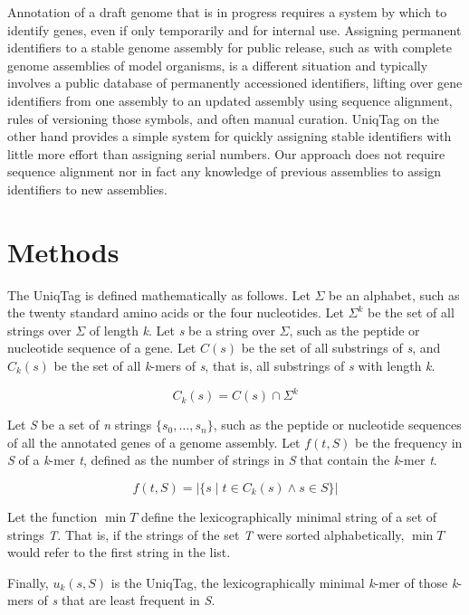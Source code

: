 \documentclass[10pt]{article}
\begin{document}
Annotation of a draft genome that is in progress requires a system by
which to identify genes, even if only temporarily and for internal use.
Assigning permanent identifiers to a stable genome assembly for public
release, such as with complete genome assemblies of model organisms, is
a different situation and typically involves a public database of
permanently accessioned identifiers, lifting over gene identifiers from
one assembly to an updated assembly using sequence alignment, rules of
versioning those symbols, and often manual curation. UniqTag on the
other hand provides a simple system for quickly assigning stable
identifiers with little more effort than assigning serial numbers. Our
approach does not require sequence alignment nor in fact any knowledge
of previous assemblies to assign identifiers to new assemblies.

\section{Methods}\label{methods}

The UniqTag is defined mathematically as follows. Let \(\Sigma\) be an
alphabet, such as the twenty standard amino acids or the four
nucleotides. Let \(\Sigma^k\) be the set of all strings over \(\Sigma\)
of length \emph{k}. Let \emph{s} be a string over \(\Sigma\), such as
the peptide or nucleotide sequence of a gene. Let \(C(s)\) be the set of
all substrings of \emph{s}, and \(C_k(s)\) be the set of all
\emph{k}-mers of \emph{s}, that is, all substrings of \emph{s} with
length \emph{k}.

\[
C_k(s) = C(s) \cap \Sigma^k
\]

Let \emph{S} be a set of \emph{n} strings \(\{s_0, \dots, s_n\}\), such
as the peptide or nucleotide sequences of all the annotated genes of a
genome assembly. Let \(f(t, S)\) be the frequency in \emph{S} of a
\emph{k}-mer \emph{t}, defined as the number of strings in \emph{S} that
contain the \emph{k}-mer \emph{t}.

\[
f(t, S) = \left\vert \{ s \mid t \in C_k(s) \wedge s \in S \} \right\vert
\]

Let the function \(\min T\) define the lexicographically minimal string
of a set of strings \emph{T}. That is, if the strings of the set
\emph{T} were sorted alphabetically, \(\min T\) would refer to the first
string in the list.

Finally, \(u_k(s, S)\) is the UniqTag, the lexicographically minimal
\emph{k}-mer of those \emph{k}-mers of \emph{s} that are least frequent
in \emph{S}.
\end{document}
